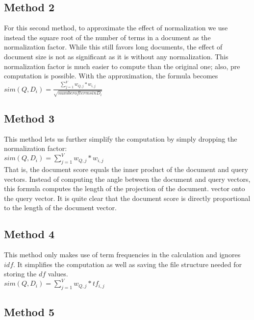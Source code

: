 \subsection{Method 2}

For this second method, to approximate the effect of normalization we use instead the square root of the number of terms in a document as the normalization factor. While this still favors long documents, the effect of document size is not as significant as it is without any normalization. This normalization factor is much easier to compute than the original one; also, pre computation is possible. With the approximation, the formula becomes\\

\(sim(Q,D_i) = \frac{\sum_{j=1}^{V}w_{Q,j}*w_{i,j}}{\sqrt{number of terms in D_i}}\)

\subsection{Method 3}

This method lets us further simplify the computation by simply dropping the normalization factor:\\

\(sim(Q,D_i) = \sum_{j=1}^{V}w_{Q,j}*w_{i,j}\)\\

That is, the document score equals the inner product of the document and query vectors. Instead of computing the angle between the document and query vectors, this formula computes the length of the projection of the document. vector onto the query vector. It is quite clear that the document score is directly proportional to the length of the document vector.

\subsection{Method 4}

This method only makes use of term frequencies in the calculation and ignores $idf$. It simplifies the computation as well as saving the file structure needed for storing the $df$ values.\\

\(sim(Q,D_i) = \sum_{j=1}^{V}w_{Q,j}*tf_{i,j}\)

\subsection{Method 5}


